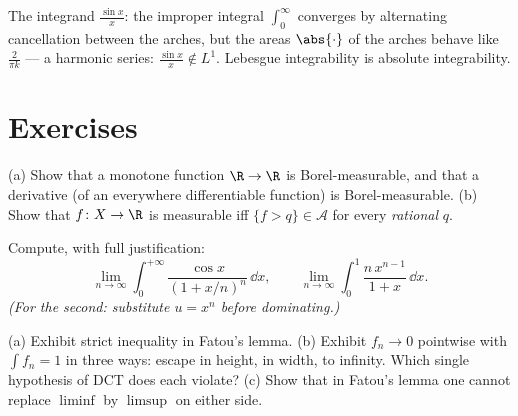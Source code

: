 \begin{omfigure}

{\small The integrand $\frac{\sin x}x$: the improper integral
$\int_0^\infty$ converges by alternating cancellation between
the arches, but the areas $\abs{\cdot}$ of the arches behave
like $\frac2{\pi k}$ --- a harmonic series: $\frac{\sin x}x
\notin L^1$. Lebesgue integrability is absolute integrability.}
\end{omfigure}

\section{Exercises}

\begin{exercise}[$\star$]\label{exo:b3:lebesgue:1}
(a) Show that a monotone function $\R \to \R$ is
Borel-measurable, and that a derivative (of an everywhere
differentiable function) is Borel-measurable.
(b) Show that $f \colon X \to \R$ is measurable iff $\{f > q\}
\in \mathcal A$ for every \emph{rational} $q$.
\end{exercise}

\begin{exercise}[$\star$]\label{exo:b3:lebesgue:2}
Compute, with full justification:
\[
\lim_{n\to\infty}\int_0^{+\infty}
\frac{\cos x}{(1 + x/n)^{n}}\,\dd x,
\qquad
\lim_{n\to\infty}\int_0^1 \frac{n\,x^{n-1}}{1 + x}\,\dd x .
\]
\emph{(For the second: substitute $u = x^n$ before dominating.)}
\end{exercise}

\begin{exercise}[$\star\star$]\label{exo:b3:lebesgue:3}
(a) Exhibit strict inequality in Fatou's lemma.
(b) Exhibit $f_n \to 0$ pointwise with $\int f_n = 1$ in three
ways: escape in height, in width, to infinity. Which single
hypothesis of DCT does each violate?
(c) Show that in Fatou's lemma one cannot replace $\liminf$ by
$\limsup$ on either side.
\end{exercise}


